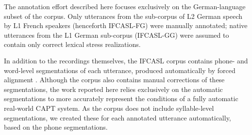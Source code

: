 \documentclass[a4paper]{article}
\newcommand{\TODO}[1]{{\color{red}\textbf{[TODO #1]}}}
\begin{document}
	The annotation effort described here focuses exclusively on the German-language subset of the corpus. Only utterances from the sub-corpus of L2 German speech by L1 French speakers (henceforth IFCASL-FG) were manually annotated; native utterances from the L1 German sub-corpus (IFCASL-GG) were assumed to contain only correct lexical stress realizations.
%	
	
	In addition to the recordings themselves, the IFCASL corpus contains phone- and word-level segmentations of each utterance, produced automatically by forced alignment \cite{Fauth2014}. Although the corpus also contains manual corrections of these segmentations, the work reported here relies exclusively on the automatic segmentations to more accurately represent the conditions of a fully automatic real-world CAPT system. %
	As the corpus does not include syllable-level segmentations,
	we created these for each annotated utterance automatically, based on the phone segmentations.
		
\end{document}
